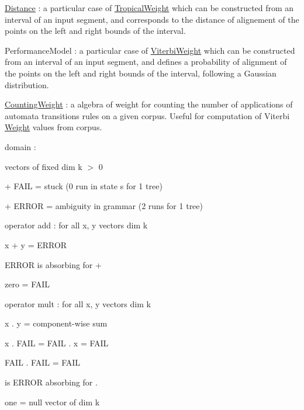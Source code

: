 \begin{DoxyItemize}
\begin{DoxyItemize}
\end{DoxyItemize}
\item {\ttfamily \mbox{\hyperlink{classDistance}{Distance}}} \+: a particular case of {\ttfamily \mbox{\hyperlink{classTropicalWeight}{Tropical\+Weight}}} which can be constructed from an interval of an input segment, and corresponds to the distance of alignement of the points on the left and right bounds of the interval.
\item {\ttfamily Performance\+Model} \+: a particular case of {\ttfamily \mbox{\hyperlink{classViterbiWeight}{Viterbi\+Weight}}} which can be constructed from an interval of an input segment, and defines a probability of alignment of the points on the left and right bounds of the interval, following a Gaussian distribution.
\item {\ttfamily \mbox{\hyperlink{classCountingWeight}{Counting\+Weight}}} \+: a algebra of weight for counting the number of applications of automata transitions rules on a given corpus. Useful for computation of Viterbi \mbox{\hyperlink{classWeight}{Weight}} values from corpus.
\begin{DoxyItemize}
\item domain \+:
\begin{DoxyItemize}
\item vectors of fixed dim k $>$ 0
\item + F\+A\+IL = stuck (0 run in state s for 1 tree)
\item + E\+R\+R\+OR = ambiguity in grammar (2 runs for 1 tree)
\end{DoxyItemize}
\item operator {\ttfamily add} \+: for all x, y vectors dim k
\begin{DoxyItemize}
\item x + y = E\+R\+R\+OR
\item E\+R\+R\+OR is absorbing for +
\end{DoxyItemize}
\item {\ttfamily zero} = F\+A\+IL
\item operator {\ttfamily mult} \+: for all x, y vectors dim k
\begin{DoxyItemize}
\item x . y = component-\/wise sum
\item x . F\+A\+IL = F\+A\+IL . x = F\+A\+IL
\item F\+A\+IL . F\+A\+IL = F\+A\+IL
\item is E\+R\+R\+OR absorbing for .
\end{DoxyItemize}
\item {\ttfamily one} = null vector of dim k 
\end{DoxyItemize}
\end{DoxyItemize}